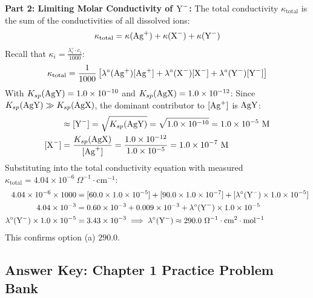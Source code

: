 \begin{solution}
\textbf{Part 2: Limiting Molar Conductivity of $\ce{Y-}$:}
The total conductivity $\kappa_{\text{total}}$ is the sum of the conductivities of all dissolved ions:
\begin{equation*}
    \kappa_{\text{total}} = \kappa(\ce{Ag+}) + \kappa(\ce{X-}) + \kappa(\ce{Y-})
\end{equation*}
Recall that $\kappa_i = \frac{\lambda_i^\circ \cdot c_i}{1000}$:
\begin{equation*}
    \kappa_{\text{total}} = \frac{1}{1000} \left[ \lambda^\circ(\ce{Ag+}) [\ce{Ag+}] + \lambda^\circ(\ce{X-}) [\ce{X-}] + \lambda^\circ(\ce{Y-}) [\ce{Y-}] \right]
\end{equation*}
With $K_{sp}(\ce{AgY}) = 1.0 \times 10^{-10}$ and $K_{sp}(\ce{AgX}) = 1.0 \times 10^{-12}$:
Since $K_{sp}(\ce{AgY}) \gg K_{sp}(\ce{AgX})$, the dominant contributor to $[\ce{Ag+}]$ is $\ce{AgY}$:
\begin{align*}
    [\ce{Ag+}] &\approx [\ce{Y-}] = \sqrt{K_{sp}(\ce{AgY})} = \sqrt{1.0 \times 10^{-10}} = 1.0 \times 10^{-5}\text{ M} \\
    [\ce{X-}] &= \frac{K_{sp}(\ce{AgX})}{[\ce{Ag+}]} = \frac{1.0 \times 10^{-12}}{1.0 \times 10^{-5}} = 1.0 \times 10^{-7}\text{ M}
\end{align*}
Substituting into the total conductivity equation with measured $\kappa_{\text{total}} = 4.04 \times 10^{-6}\ \Omega^{-1}\cdot\text{cm}^{-1}$:
\begin{align*}
    4.04 \times 10^{-6} \times 1000 &= [60.0 \times 1.0 \times 10^{-5}] + [90.0 \times 1.0 \times 10^{-7}] + [\lambda^\circ(\ce{Y-}) \times 1.0 \times 10^{-5}] \\
    4.04 \times 10^{-3} &= 0.60 \times 10^{-3} + 0.009 \times 10^{-3} + \lambda^\circ(\ce{Y-}) \times 1.0 \times 10^{-5} \\
    \lambda^\circ(\ce{Y-}) \times 1.0 \times 10^{-5} &= 3.43 \times 10^{-3} \implies \lambda^\circ(\ce{Y-}) \approx 290.0\ \Omega^{-1}\cdot\text{cm}^2\cdot\text{mol}^{-1}
\end{align*}
This confirms option (a) $290.0$.
\end{solution}

\ifshowsolutions
\else
\newpage
\subsection*{Answer Key: Chapter 1 Practice Problem Bank}

